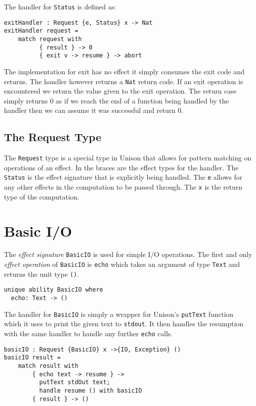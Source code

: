 \documentclass[logo,bsc,singlespacing,parskip]{infthesis}
\begin{document}
The handler for \texttt{Status} is defined as:

\begin{lstlisting}[language=unison]
exitHandler : Request {e, Status} x -> Nat
exitHandler request =
    match request with
          { result } -> 0
          { exit v -> resume } -> abort
\end{lstlisting}

The implementation for exit has no effect it simply consumes the exit code and
returns. The handler however returns a \texttt{Nat} return code. If an exit
operation is encountered we return the value given to the exit operation. The
return case simply returns 0 as if we reach the end of a function being handled
by the handler then we can assume it was successful and return 0.


\subsection{The Request Type}

The \texttt{Request} type is a special type in Unison that allows for pattern
matching on operations of an effect. In the braces are the effect types for the
handler. The \texttt{Status} is the effect signature that is explicitly being
handled. The \texttt{e} allows for any other effects in the computation to be
passed through. The \texttt{x} is the return type of the computation.

\section{Basic I/O}
\label{io}

The \emph{effect signature} \texttt{BasicIO} is used for simple I/O operations.
The first and only \emph{effect operation} of \texttt{BasicIO} is \texttt{echo}
which takes an argument of type \texttt{Text} and returns the unit
type \texttt{()}. 

\begin{lstlisting}[language=unison]
unique ability BasicIO where
  echo: Text -> ()
\end{lstlisting}

The handler for \texttt{BasicIO} is simply a wrapper for Unison's
\texttt{putText} function which it uses to print the given text to
\texttt{stdout}. It then handles the resumption with the same handler to handle
any further \texttt{echo} calls.

\begin{lstlisting}[language=unison]
basicIO : Request {BasicIO} x ->{IO, Exception} ()
basicIO result =
    match result with
        { echo text -> resume } -> 
          putText stdOut text; 
          handle resume () with basicIO
        { result } -> ()
\end{lstlisting}
\end{document}
